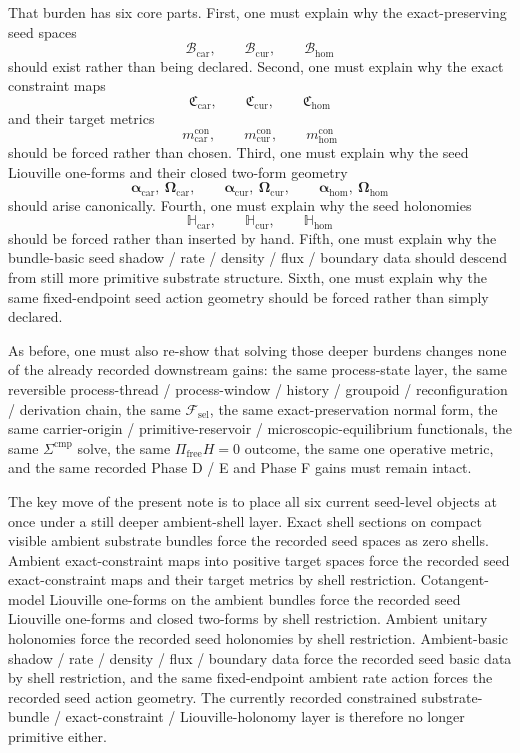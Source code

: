 \documentclass[11pt]{article}
\newcommand{\StemFunctional}{\mathscr F_{\mathrm{sel}}}
\newcommand{\TensorSeedSpace}{\mathcal B_{\mathrm{car}}}
\newcommand{\CurSeedSpace}{\mathcal B_{\mathrm{cur}}}
\newcommand{\HomSeedSpace}{\mathcal B_{\mathrm{hom}}}
\newcommand{\TensorConstraintMetric}{m_{\mathrm{car}}^{\mathrm{con}}}
\newcommand{\CurConstraintMetric}{m_{\mathrm{cur}}^{\mathrm{con}}}
\newcommand{\HomConstraintMetric}{m_{\mathrm{hom}}^{\mathrm{con}}}
\newcommand{\TensorConstraintMap}{\mathfrak C_{\mathrm{car}}}
\newcommand{\CurConstraintMap}{\mathfrak C_{\mathrm{cur}}}
\newcommand{\HomConstraintMap}{\mathfrak C_{\mathrm{hom}}}
\newcommand{\TensorSeedLiouville}{\boldsymbol{\alpha}_{\mathrm{car}}}
\newcommand{\CurSeedLiouville}{\boldsymbol{\alpha}_{\mathrm{cur}}}
\newcommand{\HomSeedLiouville}{\boldsymbol{\alpha}_{\mathrm{hom}}}
\newcommand{\TensorSeedSymplectic}{\boldsymbol{\Omega}_{\mathrm{car}}}
\newcommand{\CurSeedSymplectic}{\boldsymbol{\Omega}_{\mathrm{cur}}}
\newcommand{\HomSeedSymplectic}{\boldsymbol{\Omega}_{\mathrm{hom}}}
\newcommand{\TensorSeedTransport}{\mathbb H_{\mathrm{car}}}
\newcommand{\CurSeedTransport}{\mathbb H_{\mathrm{cur}}}
\newcommand{\HomSeedTransport}{\mathbb H_{\mathrm{hom}}}
\begin{document}
That burden has six core parts. First, one must explain why the exact-preserving seed spaces
\[
\TensorSeedSpace,\qquad
\CurSeedSpace,\qquad
\HomSeedSpace
\]
should exist rather than being declared. Second, one must explain why the exact constraint maps
\[
\TensorConstraintMap,\qquad
\CurConstraintMap,\qquad
\HomConstraintMap
\]
and their target metrics
\[
\TensorConstraintMetric,\qquad
\CurConstraintMetric,\qquad
\HomConstraintMetric
\]
should be forced rather than chosen. Third, one must explain why the seed Liouville one-forms and their closed two-form geometry
\[
\TensorSeedLiouville,\ \TensorSeedSymplectic,\qquad
\CurSeedLiouville,\ \CurSeedSymplectic,\qquad
\HomSeedLiouville,\ \HomSeedSymplectic
\]
should arise canonically. Fourth, one must explain why the seed holonomies
\[
\TensorSeedTransport,\qquad
\CurSeedTransport,\qquad
\HomSeedTransport
\]
should be forced rather than inserted by hand. Fifth, one must explain why the bundle-basic seed shadow / rate / density / flux / boundary data should descend from still more primitive substrate structure. Sixth, one must explain why the same fixed-endpoint seed action geometry should be forced rather than simply declared.

As before, one must also re-show that solving those deeper burdens changes none of the already recorded downstream gains: the same process-state layer, the same reversible process-thread / process-window / history / groupoid / reconfiguration / derivation chain, the same \(\StemFunctional\), the same exact-preservation normal form, the same carrier-origin / primitive-reservoir / microscopic-equilibrium functionals, the same \(\Sigma^{\mathrm{cmp}}\) solve, the same \(\Pi_{\mathrm{free}}H=0\) outcome, the same one operative metric, and the same recorded Phase D / E and Phase F gains must remain intact.

The key move of the present note is to place all six current seed-level objects at once under a still deeper ambient-shell layer. Exact shell sections on compact visible ambient substrate bundles force the recorded seed spaces as zero shells. Ambient exact-constraint maps into positive target spaces force the recorded seed exact-constraint maps and their target metrics by shell restriction. Cotangent-model Liouville one-forms on the ambient bundles force the recorded seed Liouville one-forms and closed two-forms by shell restriction. Ambient unitary holonomies force the recorded seed holonomies by shell restriction. Ambient-basic shadow / rate / density / flux / boundary data force the recorded seed basic data by shell restriction, and the same fixed-endpoint ambient rate action forces the recorded seed action geometry. The currently recorded constrained substrate-bundle / exact-constraint / Liouville-holonomy layer is therefore no longer primitive either.
\end{document}
